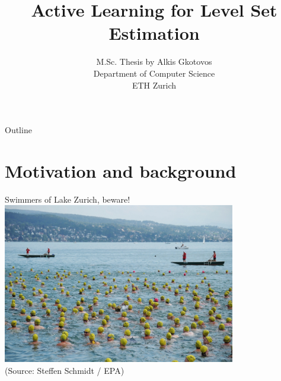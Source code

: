 \documentclass[10pt,mathserif,serif]{beamer}
\title[Active Learning for Level Set Estimation]
{Active Learning for Level Set Estimation}
\author[Alkis Gkotovos]{
\footnotesize
M.Sc. Thesis by Alkis Gkotovos\\
Department of Computer Science\\
ETH Zurich
}
\date[M.Sc. Thesis presentation]{
\footnotesize
Supervised by Prof. Andreas Krause

}
\begin{document}
\begin{frame}
  \titlepage
\end{frame}

\begin{frame}{Outline}
  \tableofcontents
\end{frame}


\section{Motivation and background}

\begin{frame}
\begin{center}
Swimmers of Lake Zurich, beware!\\
\vspace{0.2in}
\includegraphics[width=4in]{figures/swimmers.jpg}\\[-0.5em]
{\tiny (Source: Steffen Schmidt / EPA)}
\end{center}
\end{frame}
\end{document}
